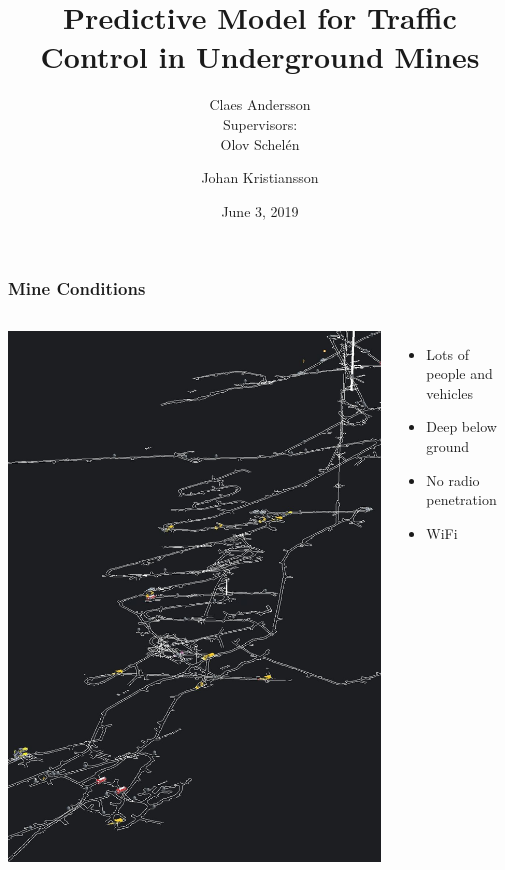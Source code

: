 \documentclass{beamer}
\title[Predictive Model] %
{Predictive Model for Traffic Control in Underground Mines}
\author{Claes Andersson \\\small Supervisors: \\ Olov Schelén \and Johan Kristiansson}
\institute[LTU] %
{Luleå University of Technology \and Mobilaris MCE}
\date{June 3, 2019}
\begin{document}
	\frame{\titlepage}

	\begin{frame}
		\frametitle{Mine Conditions}
		\begin{columns}
			\includegraphics[height=0.8\textheight]{onboard.jpg}
				\begin{itemize}
					\item Lots of people and vehicles
					\item Deep below ground
					\item No radio penetration
					\item WiFi
				\end{itemize}
		\end{columns}
	\end{frame}
\end{document}

